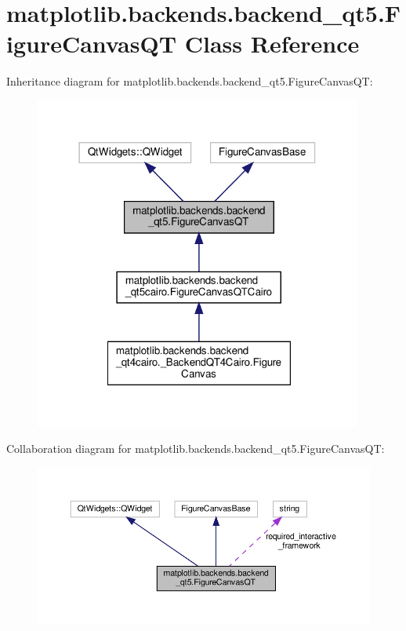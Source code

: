 \hypertarget{classmatplotlib_1_1backends_1_1backend__qt5_1_1FigureCanvasQT}{}\section{matplotlib.\+backends.\+backend\+\_\+qt5.\+Figure\+Canvas\+QT Class Reference}
\label{classmatplotlib_1_1backends_1_1backend__qt5_1_1FigureCanvasQT}


Inheritance diagram for matplotlib.\+backends.\+backend\+\_\+qt5.\+Figure\+Canvas\+QT\+:
\nopagebreak
\begin{figure}[H]
\begin{center}
\leavevmode
\includegraphics[width=306pt]{classmatplotlib_1_1backends_1_1backend__qt5_1_1FigureCanvasQT__inherit__graph}
\end{center}
\end{figure}


Collaboration diagram for matplotlib.\+backends.\+backend\+\_\+qt5.\+Figure\+Canvas\+QT\+:
\nopagebreak
\begin{figure}[H]
\begin{center}
\leavevmode
\includegraphics[width=350pt]{classmatplotlib_1_1backends_1_1backend__qt5_1_1FigureCanvasQT__coll__graph}
\end{center}
\end{figure}
